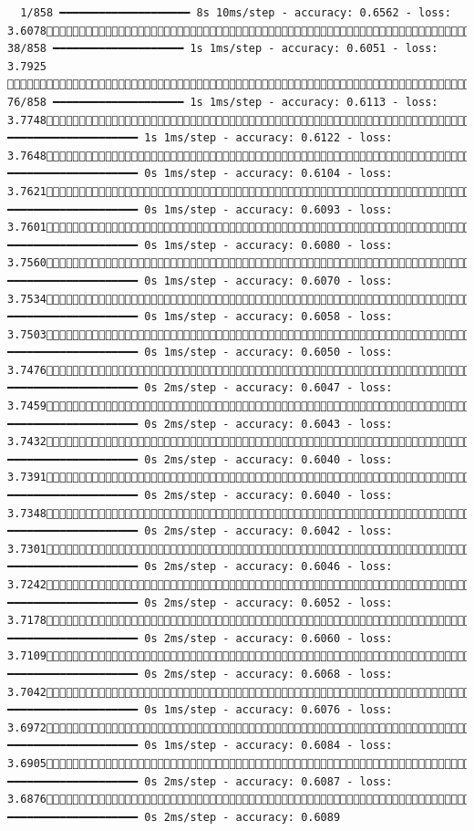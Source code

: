 \documentclass[
  letterpaper,
  DIV=11,
  numbers=noendperiod]{scrartcl}
\begin{document}
\begin{verbatim}
  1/858 ━━━━━━━━━━━━━━━━━━━━ 8s 10ms/step - accuracy: 0.6562 - loss: 3.6078 38/858 ━━━━━━━━━━━━━━━━━━━━ 1s 1ms/step - accuracy: 0.6051 - loss: 3.7925  76/858 ━━━━━━━━━━━━━━━━━━━━ 1s 1ms/step - accuracy: 0.6113 - loss: 3.7748114/858 ━━━━━━━━━━━━━━━━━━━━ 1s 1ms/step - accuracy: 0.6122 - loss: 3.7648153/858 ━━━━━━━━━━━━━━━━━━━━ 0s 1ms/step - accuracy: 0.6104 - loss: 3.7621177/858 ━━━━━━━━━━━━━━━━━━━━ 0s 1ms/step - accuracy: 0.6093 - loss: 3.7601212/858 ━━━━━━━━━━━━━━━━━━━━ 0s 1ms/step - accuracy: 0.6080 - loss: 3.7560242/858 ━━━━━━━━━━━━━━━━━━━━ 0s 1ms/step - accuracy: 0.6070 - loss: 3.7534282/858 ━━━━━━━━━━━━━━━━━━━━ 0s 1ms/step - accuracy: 0.6058 - loss: 3.7503314/858 ━━━━━━━━━━━━━━━━━━━━ 0s 1ms/step - accuracy: 0.6050 - loss: 3.7476330/858 ━━━━━━━━━━━━━━━━━━━━ 0s 2ms/step - accuracy: 0.6047 - loss: 3.7459355/858 ━━━━━━━━━━━━━━━━━━━━ 0s 2ms/step - accuracy: 0.6043 - loss: 3.7432388/858 ━━━━━━━━━━━━━━━━━━━━ 0s 2ms/step - accuracy: 0.6040 - loss: 3.7391421/858 ━━━━━━━━━━━━━━━━━━━━ 0s 2ms/step - accuracy: 0.6040 - loss: 3.7348454/858 ━━━━━━━━━━━━━━━━━━━━ 0s 2ms/step - accuracy: 0.6042 - loss: 3.7301491/858 ━━━━━━━━━━━━━━━━━━━━ 0s 2ms/step - accuracy: 0.6046 - loss: 3.7242529/858 ━━━━━━━━━━━━━━━━━━━━ 0s 2ms/step - accuracy: 0.6052 - loss: 3.7178568/858 ━━━━━━━━━━━━━━━━━━━━ 0s 2ms/step - accuracy: 0.6060 - loss: 3.7109605/858 ━━━━━━━━━━━━━━━━━━━━ 0s 2ms/step - accuracy: 0.6068 - loss: 3.7042643/858 ━━━━━━━━━━━━━━━━━━━━ 0s 1ms/step - accuracy: 0.6076 - loss: 3.6972680/858 ━━━━━━━━━━━━━━━━━━━━ 0s 1ms/step - accuracy: 0.6084 - loss: 3.6905696/858 ━━━━━━━━━━━━━━━━━━━━ 0s 2ms/step - accuracy: 0.6087 - loss: 3.6876707/858 ━━━━━━━━━━━━━━━━━━━━ 0s 2ms/step - accuracy: 0.6089 
\end{verbatim}
\end{document}
